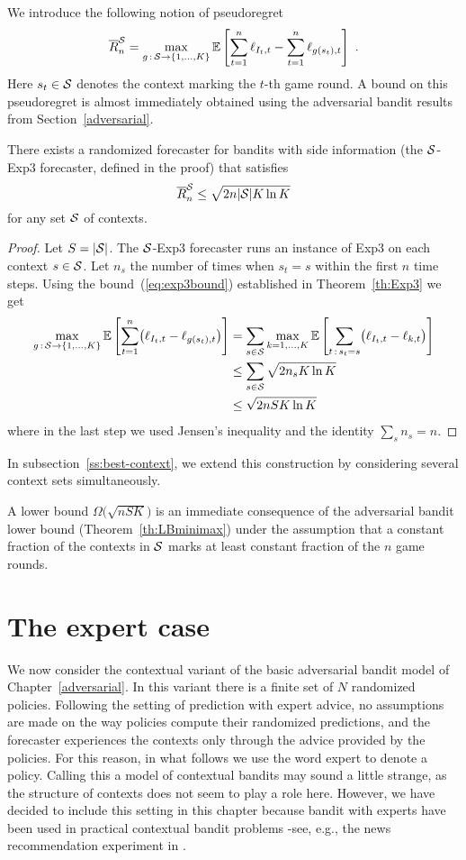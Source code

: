 We introduce the following notion of pseudoregret
\[
	\overline{R}^{\mathcal{S}}_n = \max_{g \,:\, \mathcal{S}\to\{1,\dots,K\}} \mathbb{E}\left[ \sum_{t=1}^n \ell_{I_t,t} - \sum_{t=1}^n \ell_{g(s_t),t} \right]~.
\]
Here $s_t\in\mathcal{S}$ denotes the context marking the $t$-th game round. A bound on this pseudoregret is almost immediately obtained using the adversarial bandit results from Section~\ref{adversarial}. 
%
\begin{theorem}
\label{th:context-simple}
There exists a randomized forecaster for bandits with side information (the $\mathcal{S}$-Exp3 forecaster, defined in the proof) that satisfies
\[
	\overline{R}^{\mathcal{S}}_n \le \sqrt{2n |\mathcal{S}| K\ln K}
\]
for any set $\mathcal{S}$ of contexts.
\end{theorem}
%
\begin{proof}
Let $S = |\mathcal{S}|$.
The $\mathcal{S}$-Exp3 forecaster runs an instance of Exp3 on each context $s\in\mathcal{S}$. Let $n_s$ the number of times when $s_t=s$ within the first $n$ time steps. Using the bound~(\ref{eq:exp3bound}) established in Theorem~\ref{th:Exp3} we get
\begin{align*}
	\max_{g \,:\, \mathcal{S}\to\{1,\dots,K\}} \mathbb{E}\left[ \sum_{t=1}^n \bigl(\ell_{I_t,t} - \ell_{g(s_t),t}\bigr) \right]
&=
	\sum_{s\in\mathcal{S}} \max_{k=1,\dots,K} \mathbb{E}\left[ \sum_{t \,:\, s_t=s} \bigl(\ell_{I_t,t} - \ell_{k,t} \bigr)\right]
\\ &\le
	\sum_{s\in\mathcal{S}} \sqrt{2 n_s K\ln K}
\\ &\le
	\sqrt{2 n S K\ln K}
\end{align*}
where in the last step we used Jensen's inequality and the identity $\sum_s n_s = n$.
\end{proof}
%
In subsection~\ref{ss:best-context}, we extend this construction by considering several context sets simultaneously.

A lower bound $\Omega\bigl(\sqrt{nSK}\bigl)$ is an immediate consequence of the adversarial bandit lower bound (Theorem~\ref{th:LBminimax}) under the assumption that a constant fraction of the contexts in $\mathcal{S}$ marks at least constant fraction of the $n$ game rounds.


\section{The expert case}
\label{s:context-adv}
%
We now consider the contextual variant of the basic adversarial bandit model of Chapter~\ref{adversarial}. In this variant there is a finite set of $N$ randomized policies. Following the setting of prediction with expert advice, no assumptions are made on the way policies compute their randomized predictions, and the forecaster experiences the contexts only through the advice provided by the policies. For this reason, in what follows we use the word expert to denote a policy. Calling this a model of contextual bandits may sound a little strange, as the structure of contexts does not seem to play a role here. However, we have decided to include this setting in this chapter because bandit with experts have been used in practical contextual bandit problems -see, e.g., the news recommendation experiment in \cite{beygelzimer2010contextual}.

